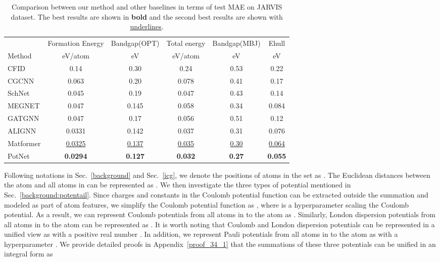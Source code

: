 \documentclass[nohyperref]{article}
\theoremstyle{plain}
\theoremstyle{definition}
\theoremstyle{remark}
\begin{document}
\begin{table*}[t]
\caption{Comparison between our method and other baselines in terms of test MAE on JARVIS dataset. The best results are shown in \textbf{bold} and the second best results are shown with \underline{underlines}.}
\label{tb:jarvis}
\begin{center}
\begin{tabular}{l|ccccc}
\toprule
& Formation Energy & Bandgap(OPT) & Total energy & Bandgap(MBJ) & Ehull\\ 

\cmidrule(r){2-6}
Method & eV/atom  &  eV & eV/atom & eV & eV   \\
\midrule
CFID & 0.14 &    0.30 & 0.24  &  0.53 & 0.22 \\
CGCNN  & 0.063 &   0.20 & 0.078 &  0.41 & 0.17  \\
SchNet & 0.045 &   0.19 & 0.047 & 0.43 & 0.14  \\
MEGNET  & 0.047 &   0.145 & 0.058 & 0.34 & 0.084  \\
GATGNN  & 0.047 &   0.17 & 0.056 & 0.51 & 0.12  \\
ALIGNN  & 0.0331 & 0.142 & 0.037 & 0.31 & 0.076\\
Matformer  & \underline{0.0325} & \underline{0.137} & \underline{0.035} & \underline{0.30} & \underline{0.064}\\
PotNet   & \textbf{0.0294} & \textbf{0.127} & \textbf{0.032} & \textbf{0.27} & \textbf{0.055}\\
\bottomrule
\end{tabular}
\end{center}
\vskip -0.25in
\end{table*}

Following notations in Sec.~\ref{background} and Sec.~\ref{icg}, we denote the positions of atoms in the set  as . The Euclidean distances between the atom  and all atoms in  can be represented as . We then investigate the three types of potential mentioned in Sec.~\ref{background:potentail}. Since charges and constants in the Coulomb potential function can be extracted outside the summation and modeled as part of atom features, we simplify the Coulomb potential function as , where  is a hyperparameter scaling the Coulomb potential. As a result, we can represent Coulomb potentials from all atoms in  to the atom  as . Similarly, London dispersion potentials from all atoms in  to the atom  can be represented as . It is worth noting that Coulomb and London dispersion potentials can be represented in a unified view as  with a positive real number . In addition, we represent Pauli potentials from all atoms in  to the atom  as  with a hyperparameter . We provide detailed proofs in Appendix~\ref{proof_34_1} that the summations of these three potentials can be unified in an integral form as
\vspace{-0.1cm}
\end{document}
